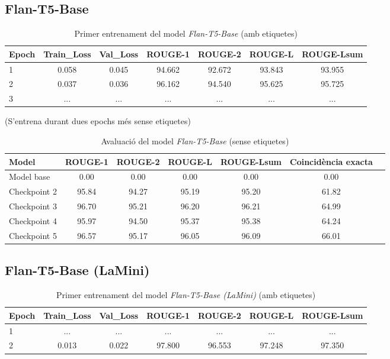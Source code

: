 \subsection{Flan-T5-Base}
\begin{table}[H]
    \centering
    \begin{tabular}{lcccccc}
    \toprule
    Epoch & Train\_Loss & Val\_Loss & ROUGE-1 & ROUGE-2 & ROUGE-L & ROUGE-Lsum \\
    \midrule
    1 & 0.058 & 0.045 & 94.662 & 92.672 & 93.843 & 93.955 \\
    2 & 0.037 & 0.036 & 96.162 & 94.540 & 95.625 & 95.725 \\
    3 & ... & ... & ... & ... & ... & ... \\
    \bottomrule
    \end{tabular}
    \caption[Primer entrenament del model \textit{Flan-T5-Base}]{Primer entrenament del model \textit{Flan-T5-Base} (amb etiquetes)}
\end{table}

(S'entrena durant dues epochs més sense etiquetes)

\begin{table}[H]
    \centering
    \begin{tabular}{lcccccc}
    \toprule
    Model & ROUGE-1 & ROUGE-2 & ROUGE-L & ROUGE-Lsum & Coincidència exacta \\
    \midrule
    Model base & 0.00 & 0.00 & 0.00 & 0.00 & 0.00 \\
    Checkpoint 2 & 95.84 & 94.27 & 95.19 & 95.20 & 61.82 \\
    Checkpoint 3 & 96.70 & 95.21 & 96.20 & 96.21 & 64.99 \\
    Checkpoint 4 & 95.97 & 94.50 & 95.37 & 95.38 & 64.24 \\
    Checkpoint 5 & 96.57 & 95.17 & 96.05 & 96.09 & 66.01 \\
    \bottomrule
    \end{tabular}
    \caption[Avaluació del model \textit{Flan-T5-Base}]{Avaluació del model \textit{Flan-T5-Base} (sense etiquetes)}
\end{table}







\subsection{Flan-T5-Base (LaMini)}
\begin{table}[H]
    \centering
    \begin{tabular}{lcccccc}
    \toprule
    Epoch & Train\_Loss & Val\_Loss & ROUGE-1 & ROUGE-2 & ROUGE-L & ROUGE-Lsum \\
    \midrule
    1 & ...   & ...   & ...    & ...    & ...    & ... \\
    2 & 0.013 & 0.022 & 97.800 & 96.553 & 97.248 & 97.350 \\
    \bottomrule
    \end{tabular}
    \caption[Primer entrenament del model \textit{Flan-T5-Base (LaMini)}]{Primer entrenament del model \textit{Flan-T5-Base (LaMini)} (amb etiquetes)}
\end{table}

